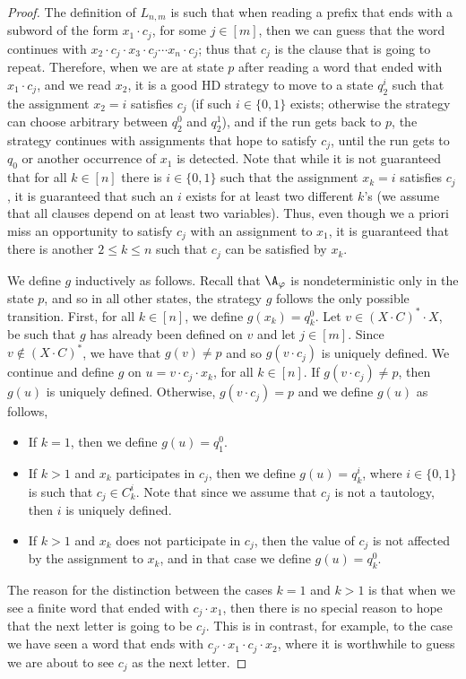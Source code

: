 \documentclass{lmcs}
\begin{document}
\begin{proof}
	The definition of $L_{n,m}$ is such that when reading a prefix that ends with a subword of the form $x_1\cdot c_j$, for some $j\in [m]$,  then we can guess that the word continues with $x_2\cdot c_j \cdot x_3 \cdot c_j \cdots x_n\cdot c_j$; thus that $c_j$ is the clause that is going to repeat. Therefore, when we are at state $p$ after reading a word that ended with $x_1 \cdot c_j$, and we read $x_2$, it is a good HD strategy to move to a state $q^i_2$ such that the assignment $x_2=i$ satisfies $c_j$ (if such $i\in \{0,1\}$ exists; otherwise the strategy can choose arbitrary between $q^0_2$ and $q^1_2$), and if the run gets back to $p$, the strategy continues with assignments that hope to satisfy $c_j$, until the run gets to $q_0$ or another occurrence of $x_1$ is detected. Note that while it is not guaranteed that for all $k\in [n]$ there is $i\in \{0,1\}$ such that the assignment $x_k=i$ satisfies $c_j$, it is guaranteed that such an $i$ exists for at least two different $k$'s (we assume that all clauses depend on at least two variables). Thus, even though we a priori miss an opportunity to satisfy $c_j$  with an assignment to $x_1$, it is guaranteed that there is another $2\leq k\leq n$ such that $c_j$ can be satisfied by $x_k$. 
	 
	We define $g$ inductively as follows. Recall that $\A_\varphi$ is nondeterministic only in the state $p$, and so in all other states, the strategy $g$ follows the only possible transition. First, for all $k\in [n]$, we define $g(x_k)=q^0_k$. Let $v\in (X\cdot C)^*\cdot X$, be such that $g$ has already been defined on $v$ and let $j\in [m]$. Since $v\notin (X\cdot C)^*$, we have that $g(v)\neq p$ and so $g(v\cdot c_j)$ is uniquely defined. We continue and define $g$ on $u=v\cdot c_j\cdot x_k$, for all $k\in [n]$. If $g(v\cdot c_j)\neq p$, then $g(u)$ is uniquely defined. Otherwise, $g(v\cdot c_j)= p$ and we define $g(u)$ as follows,
	\begin{itemize}
		\item If $k=1$, then we define $g(u)=q^0_1$.
		\item If $k>1$ and $x_k$ participates in $c_j$, then we define $g(u)=q^i_k$, where $i\in \{0,1\}$ is such that $c_j\in C^i_k$. Note that since we assume that $c_j$ is not a tautology, then $i$ is uniquely defined.
		\item If $k>1$ and $x_k$ does not participate in $c_j$, then the value of $c_j$ is not affected by the assignment to $x_k$, and in that case we define $g(u)=q^0_k$.
	\end{itemize}
	\noindent %
	The reason for the distinction between the cases $k=1$ and $k>1$ is that when we see a finite word that ended with $c_j\cdot x_1$, then there is no special reason to hope that the next letter is going to be $c_j$. This is in contrast, for example, to the case we have seen a word that ends with $c_{j'}\cdot x_1\cdot c_j\cdot x_2$, where it is worthwhile to guess we are about to see $c_j$ as the next letter. 
	

\end{proof}
\end{document}
